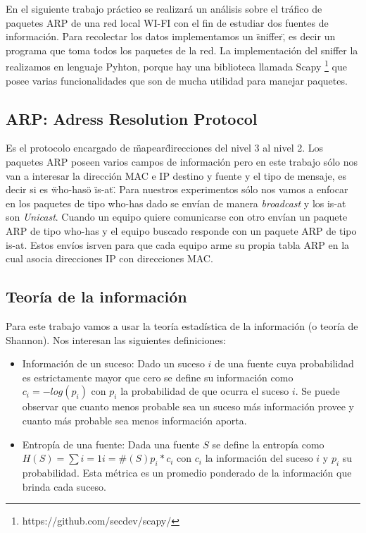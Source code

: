 En el siguiente trabajo pr\'actico se realizar\'a un an\'alisis sobre el tr\'afico de paquetes ARP de una red local WI-FI con el fin de estudiar dos fuentes de informaci\'on. Para recolectar los datos implementamos un \"sniffer\", es decir un programa que toma todos los paquetes de la red. La implementaci\'on del sniffer la realizamos en lenguaje Pyhton, porque hay una biblioteca llamada Scapy \footnote{https://github.com/secdev/scapy/} que posee varias funcionalidades que son de mucha utilidad para manejar paquetes. 

\subsection{ARP: Adress Resolution Protocol}

Es el protocolo encargado de \"mapear\" direcciones del nivel 3 al nivel 2. Los paquetes ARP poseen varios campos de informaci\'on pero en este trabajo s\'olo nos van a interesar la direcci\'on MAC e IP destino y fuente y el tipo de mensaje, es decir si es \"who-has\" o \"is-at\".
Para nuestros experimentos s\'olo nos vamos a enfocar en los paquetes de tipo who-has dado se env\'ian de manera \emph{broadcast} y los is-at son \emph{Unicast}. Cuando un equipo quiere comunicarse con otro env\'ian un paquete ARP de tipo who-has y el equipo buscado responde con un paquete ARP de tipo is-at. Estos env\'ios isrven para que cada equipo arme su propia tabla ARP en la cual asocia direcciones IP con direcciones MAC.

\subsection{Teor\'ia de la informaci\'on}

Para este trabajo vamos a usar la teor\'ia estad\'istica de la informaci\'on (o teor\'ia de Shannon). Nos interesan las siguientes definiciones:

\begin{itemize}

\item Informaci\'on de un suceso: Dado un suceso $i$ de una fuente cuya probabilidad es estrictamente mayor que cero se define su informaci\'on como $c_i = -log(p_i)$ con $p_i$ la probabilidad de que ocurra el suceso $i$. Se puede observar que cuanto menos probable sea un suceso m\'as informaci\'on provee y cuanto m\'as probable sea menos informaci\'on aporta.

\item Entrop\'ia de una fuente: Dada una fuente $S$ se define la entrop\'ia como $H(S) = \sum{i=1}{i=\#(S)} p_i*c_i$ con $c_i$ la informaci\'on del suceso $i$ y $p_i$ su probabilidad. Esta m\'etrica es un promedio ponderado de la informaci\'on que brinda cada suceso.  

\end{itemize}

